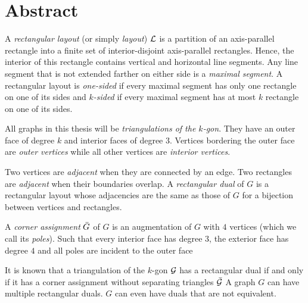 
\section*{Abstract}
\thispagestyle{plain}

  A  \emph{rectangular layout} (or simply \emph{layout}) $\mathcal{L}$ is a partition of an axis-parallel rectangle into a finite set of interior-disjoint axis-parallel rectangles. Hence, the interior of this rectangle contains vertical and horizontal line segments. Any line segment that is not extended farther on either side is a \emph{maximal segment}. A rectangular layout is \emph{one-sided} if every maximal segment has only one rectangle on one of its sides and \emph{$k$-sided} if every maximal segment has at most $k$ rectangle on one of its sides.

  All graphs in this thesis will be \emph{triangulations of the $k$-gon}. They have an outer face of degree $k$ and interior faces of degree $3$.
  Vertices bordering the outer face are \emph{outer vertices} while all other vertices are \emph{interior vertices}.

  Two vertices are \emph{adjacent} when they are connected by an edge. Two rectangles are \emph{adjacent} when their boundaries overlap. A \emph{rectangular dual} of $G$ is a rectangular layout whose adjacencies are the same as those of $G$ for a bijection between vertices and rectangles.

  A \emph{corner assignment} $\bar{G}$ of $G$ is an augmentation of $G$ with $4$ vertices (which we call its \emph{poles}). Such that every interior face has degree $3$, the exterior face has degree $4$ and all poles are incident to the outer face


  It is known that a triangulation of the $k$-gon $\mathcal{G}$ has a rectangular dual if and only if it has a corner assignment without separating triangles $\bar{\mathcal{G}}$
  A graph $G$ can have multiple rectangular duals. $G$ can even have duals that are not equivalent.


